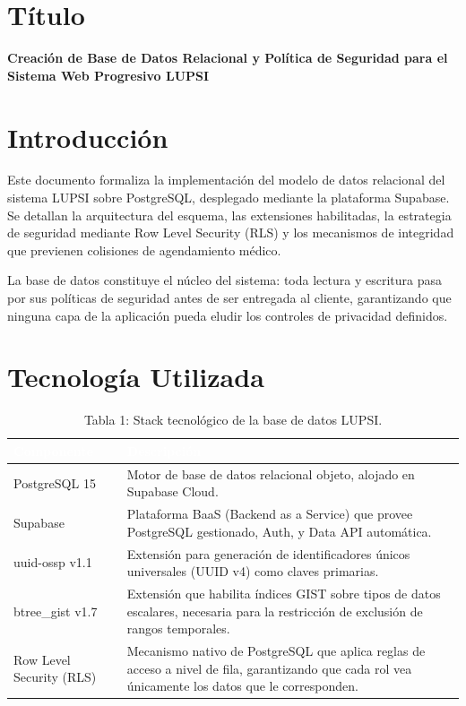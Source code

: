 \documentclass[a4paper,12pt]{article}
\renewcommand{\arraystretch}{1.1}
\begin{document}
\raggedbottom

\section{Título}
\textbf{Creación de Base de Datos Relacional y Política de Seguridad para el Sistema Web Progresivo LUPSI}

\section{Introducción}
Este documento formaliza la implementación del modelo de datos relacional del sistema LUPSI sobre PostgreSQL, desplegado mediante la plataforma Supabase. Se detallan la arquitectura del esquema, las extensiones habilitadas, la estrategia de seguridad mediante Row Level Security (RLS) y los mecanismos de integridad que previenen colisiones de agendamiento médico.

La base de datos constituye el núcleo del sistema: toda lectura y escritura pasa por sus políticas de seguridad antes de ser entregada al cliente, garantizando que ninguna capa de la aplicación pueda eludir los controles de privacidad definidos.

\section{Tecnología Utilizada}
\begin{table}[H]
\centering
\small
\renewcommand{\arraystretch}{1.5}
\begin{tabular}{|p{4cm}|p{9.5cm}|}
\hline
\rowcolor{SKTPrimary}
\textcolor{white}{\textbf{Componente}} & \textcolor{white}{\textbf{Descripción}} \\
\hline
PostgreSQL 15 & Motor de base de datos relacional objeto, alojado en Supabase Cloud. \\
\hline
Supabase & Plataforma BaaS (Backend as a Service) que provee PostgreSQL gestionado, Auth, y Data API automática. \\
\hline
uuid-ossp v1.1 & Extensión para generación de identificadores únicos universales (UUID v4) como claves primarias. \\
\hline
btree\_gist v1.7 & Extensión que habilita índices GIST sobre tipos de datos escalares, necesaria para la restricción de exclusión de rangos temporales. \\
\hline
Row Level Security (RLS) & Mecanismo nativo de PostgreSQL que aplica reglas de acceso a nivel de fila, garantizando que cada rol vea únicamente los datos que le corresponden. \\
\hline
\end{tabular}
\caption*{Tabla 1: Stack tecnológico de la base de datos LUPSI.}
\end{table}
\end{document}
